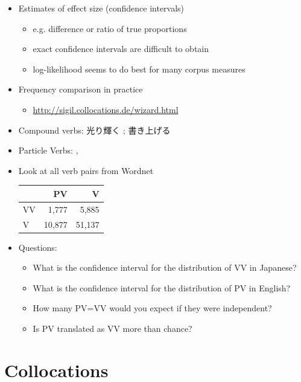\documentclass[a4paper,landscape,headrule,footrule,dvips]{foils}
\begin{document}
\begin{CJK}{UTF8}{min}
\begin{itemize}
\item Estimates of effect size (confidence intervals)
\begin{itemize}
\item e.g. difference or ratio of true proportions
\item exact confidence intervals are difficult to obtain
\item log-likelihood seems to do best for many corpus measures
\end{itemize}
\item Frequency comparison in practice
\begin{itemize}
\item \url{http://sigil.collocations.de/wizard.html}
\end{itemize}
\end{itemize}

\begin{itemize}
\item Compound verbs: 光り輝く ; 
  書き上げる 
\item Particle Verbs: , 
\item Look at all verb pairs from Wordnet \\
  \begin{tabular}{l|rr}
      & PV & V \\ \hline
   VV &  1,777 & 5,885 \\     
   V  &  10,877 & 51,137 
  \end{tabular}
\item Questions:
  \begin{itemize}
  \item What is the confidence interval for the distribution of VV in Japanese?
  \item What is the confidence interval for the distribution of PV in English?
  \item How many PV=VV would you expect if they were independent?
  \item Is PV translated as VV more than chance?
  \end{itemize}
\end{itemize}


\section{Collocations}


\end{CJK}
\end{document}
